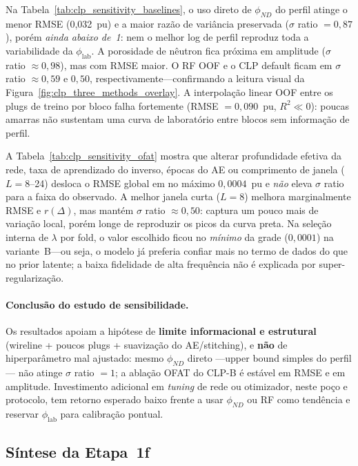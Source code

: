 \documentclass[11pt,a4paper]{article}
\newcommand{\philab}{\ensuremath{\phi_{\mathrm{lab}}}}
\begin{document}
Na Tabela~\ref{tab:clp_sensitivity_baselines}, o uso direto de $\phi_{ND}$
do perfil atinge o menor RMSE (0,032~pu) e a maior razão de variância
preservada ($\sigma$ ratio $=0{,}87$), porém \emph{ainda abaixo de~1}:
nem o melhor log de perfil reproduz toda a variabilidade da
\philab{}.
A porosidade de nêutron fica próxima em amplitude ($\sigma$ ratio
$\approx 0{,}98$), mas com RMSE maior.
O RF OOF e o CLP default ficam em $\sigma$ ratio $\approx 0{,}59$ e
$0{,}50$, respectivamente---confirmando a leitura visual da
Figura~\ref{fig:clp_three_methods_overlay}.
A interpolação linear OOF entre os plugs de treino por bloco falha
fortemente (RMSE $=0{,}090$~pu, $R^2\ll 0$): poucas amarras não sustentam
uma curva de laboratório entre blocos sem informação de perfil.

A Tabela~\ref{tab:clp_sensitivity_ofat} mostra que alterar profundidade
efetiva da rede, taxa de aprendizado do inverso, épocas do AE ou
comprimento de janela ($L=8$--24) desloca o RMSE global em no máximo
$0{,}0004$~pu e \emph{não} eleva $\sigma$ ratio para a faixa do
observado.
A melhor janela curta ($L=8$) melhora marginalmente RMSE e $r(\Delta)$,
mas mantém $\sigma$ ratio $\approx 0{,}50$: captura um pouco mais de
variação local, porém longe de reproduzir os picos da curva preta.
Na seleção interna de $\lambda$ por fold, o valor escolhido ficou no
\emph{mínimo} da grade ($0{,}0001$) na variante~B---ou seja, o modelo
já preferia confiar mais no termo de dados do que no prior latente;
a baixa fidelidade de alta frequência não é explicada por
super-regularização.

\paragraph{Conclusão do estudo de sensibilidade.}
Os resultados apoiam a hipótese de \textbf{limite informacional e
estrutural} (wireline + poucos plugs + suavização do AE/stitching), e
\textbf{não} de hiperparâmetro mal ajustado: mesmo $\phi_{ND}$ direto
---upper bound simples do perfil--- não atinge $\sigma$ ratio $=1$;
a ablação OFAT do CLP-B é estável em RMSE e em amplitude.
Investimento adicional em \emph{tuning} de rede ou otimizador, neste
poço e protocolo, tem retorno esperado baixo frente a usar $\phi_{ND}$
ou RF como tendência e reservar \philab{} para calibração pontual.

\subsection{Síntese da Etapa~1f}
\end{document}
